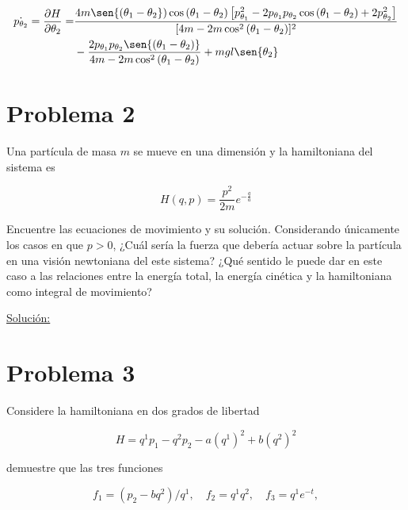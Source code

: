 \documentclass[a4paper,10pt]{article}
\numberwithin{equation}{section}
\begin{document}
\begin{align}
\begin{split}
 \dot{p_{\theta_2}} = \frac{\partial H}{\partial \theta_2} = 
 &\frac{4m\sen{(\theta_1 - \theta_2})\cos{(\theta_1 - \theta_2)}
 \left[p_{\theta_1}^2 - 2p_{\theta_1}p_{\theta_2}\cos{(\theta_1 - \theta_2)} + 2p_{\theta_2}^2\right]}{[4m - 2m\cos^2{(\theta_1 - \theta_2)}]^2} \\
 &- \frac{2p_{\theta_1}p_{\theta_2}\sen{(\theta_1 - \theta_2)}}{4m - 2m\cos^2{(\theta_1 - \theta_2)}} 
 + mgl\sen{\theta_2}
\end{split}
\end{align}
















\section{Problema 2}

Una partícula de masa $m$ se mueve en una dimensión y la hamiltoniana del sistema 
es 

$$
H(q,p) = \frac{p^2}{2m}e^{-\frac{q}{a}}
$$

Encuentre las ecuaciones de movimiento y su solución. Considerando únicamente los casos 
en que $p>0$, ¿Cuál sería la fuerza que debería actuar sobre la partícula en una visión
newtoniana del este sistema? ¿Qué sentido le puede dar en este caso a las relaciones entre 
la energía total, la energía cinética y la hamiltoniana como integral de movimiento?

\vspace{.3cm}

\underline{Solución:} \vspace{.3cm}

\section{Problema 3}

Considere la hamiltoniana en dos grados de libertad 

$$
H = q^1p_1 - q^2p_2 - a(q^1)^2 + b(q^2)^2
$$

demuestre que las tres funciones 

$$
f_1 = (p_2 - bq^2)/q^1, \quad f_2 = q^1q^2, \quad f_3=q^1e^{-t},
$$
\end{document}
